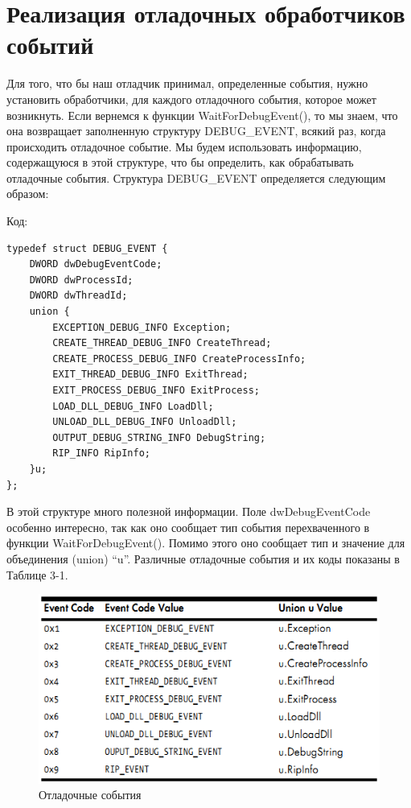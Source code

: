 \documentclass[12pt]{book}
\begin{document}
\section{Реализация отладочных обработчиков событий}

Для того, что бы наш отладчик принимал, определенные события, нужно установить обработчики, для каждого отладочного события, которое может возникнуть. Если вернемся к функции WaitForDebugEvent(), то мы знаем, что она возвращает заполненную структуру DEBUG\_EVENT, всякий раз, когда происходить отладочное событие. Мы будем использовать информацию, содержащуюся в этой структуре, что бы определить, как обрабатывать отладочные события. Структура DEBUG\_EVENT определяется следующим образом:

Код:
\begin{lstlisting}
typedef struct DEBUG_EVENT {
    DWORD dwDebugEventCode;
    DWORD dwProcessId;
    DWORD dwThreadId;
    union {
        EXCEPTION_DEBUG_INFO Exception;
        CREATE_THREAD_DEBUG_INFO CreateThread;
        CREATE_PROCESS_DEBUG_INFO CreateProcessInfo;
        EXIT_THREAD_DEBUG_INFO ExitThread;
        EXIT_PROCESS_DEBUG_INFO ExitProcess;
        LOAD_DLL_DEBUG_INFO LoadDll;
        UNLOAD_DLL_DEBUG_INFO UnloadDll;
        OUTPUT_DEBUG_STRING_INFO DebugString;
        RIP_INFO RipInfo;
    }u;
};
\end{lstlisting}

В этой структуре много полезной информации. Поле dwDebugEventCode особенно интересно, так как оно сообщает тип события перехваченного в функции WaitForDebugEvent(). Помимо этого оно сообщает тип и значение для объединения (union) “u”. Различные отладочные события и их коды показаны в Таблице 3-1.

\begin{figure}
  \center
  \includegraphics{./pic/chap3/1.png}
  \caption{Отладочные события}
\end{figure}
\end{document}
